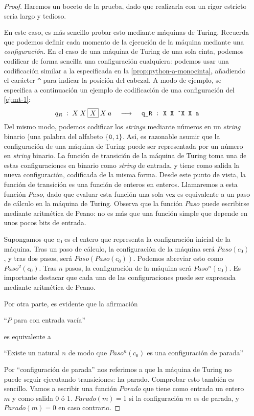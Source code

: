 \begin{proof}
Haremos un boceto de la prueba, dado que realizarla con un rigor estricto sería largo y tedioso.

En este caso, es más sencillo probar esto mediante máquinas de Turing. Recuerda que podemos definir cada momento de la ejecución de la máquina mediante una \emph{configuración}. En el caso de una máquina de Turing de una sola cinta, podemos codificar de forma sencilla una configuración cualquiera: podemos usar una codificación similar a la especificada en la \cref{prop:python-a-monocinta}, añadiendo el carácter \texttt{\^{}} para indicar la posición del cabezal. A modo de ejemplo, se especifica a continuación un ejemplo de codificación de una configuración del \cref{ej:mt-1}:
$$
q_R\;:\;X\:X\:\fbox{$X$}\:X\:a \;\;\;\; \longrightarrow \;\;\;\; \texttt{q\_R : X X \^{}X X a}
$$
Del mismo modo, podemos codificar los \emph{strings} mediante números en un \emph{string} binario (una palabra del alfabeto $\{\texttt{0}, \texttt{1}\}$. Así, es razonable asumir que la configuración de una máquina de Turing puede ser representada por un número en \emph{string} binario. La función de transición de la máquina de Turing toma una de estas configuraciones en binario como \emph{string} de entrada, y tiene como salida la nueva configuración, codificada de la misma forma. Desde este punto de vista, la función de transición es una función de enteros en enteros. Llamaremos a esta función $Paso$, dado que evaluar esta función una sola vez es equivalente a un paso de cálculo en la máquina de Turing. Observa que la función $Paso$ puede escribirse mediante aritmética de Peano: no es más que una función simple que depende en unos pocos bits de entrada.

Supongamos que $c_0$ es el entero que representa la configuración inicial de la máquina. Tras un paso de cálculo, la configuración de la máquina será $Paso(c_0)$, y tras dos pasos, será $Paso(Paso(c_0))$. Podemos abreviar esto como $Paso^2(c_0)$. Tras $n$ pasos, la configuración de la máquina será $Paso^n(c_0)$. Es importante destacar que cada una de las configuraciones puede ser expresada mediante aritmética de Peano.

Por otra parte, es evidente que la afirmación
\begin{adjustwidth}{30pt}{}
    ``$P$ para con entrada vacía''
\end{adjustwidth}
es equivalente a
\begin{adjustwidth}{30pt}{}
    ``Existe un natural $n$ de modo que $Paso^n(c_0)$ es una configuración de parada''
\end{adjustwidth}
Por ``configuración de parada'' nos referimos a que la máquina de Turing no puede seguir ejecutando transiciones: ha parado. Comprobar esto también es sencillo. Vamos a escribir una función $Parado$ que tiene como entrada un entero $m$ y como salida $0$ ó $1$. $Parado(m)=1$ si la configuración $m$ es de parada, y $Parado(m)=0$ en caso contrario.


\end{proof}

